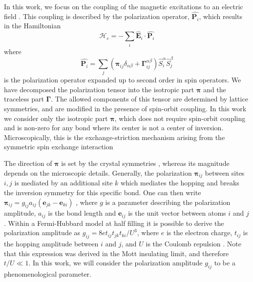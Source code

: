 \documentclass[aps,prb,reprint,twocolumns,superscriptaddress,nofootinbib]{revtex4-2}
\begin{document}
	In this work, we focus on the coupling of the magnetic excitations to an electric field \cite{damascelliDirectTwoMagnonOptical1998,azumaOpticalResponseDue2005,schoenfeldDynamicalRenormalizationMagnetic2024}. This coupling is described by the polarization operator, $\hat{\bm P_{i}}$, which results in the Hamiltonian \cite{moriyaTheoryLightScattering1967,zhuSpinorbitCouplingElectronic2014,malzTopologicalMagnonAmplification2019,seifertOpticalExcitationMagnons2019,mostovoyMultiferroicsDifferentRoutes2024}
	\begin{equation}
		\mathcal H_c = -\sum_i \hat{\bm E}_i \cdot \hat{\bm P_{i}}
	\end{equation}
	where 
	\begin{equation}
		\hat{\bm P_{i}} = \sum_j\left(\bm\pi_{ij}\delta_{\alpha\beta} +\bm\Gamma_{ij}^{\alpha\beta} \right) \hat S_i^\alpha \hat S_j^\beta
	\end{equation}
	is the polarization operator expanded up to second order in spin operators. 
	We have decomposed the polarization tensor into the isotropic part $\bm \pi$ and the traceless part $\bm \Gamma$. The allowed components of this tensor are determined by lattice symmetries, and are modified in the presence of spin-orbit coupling. 
	In this work we consider only the isotropic part $\bm\pi$, which does not require spin-orbit coupling and is non-zero for any bond where its center is not a center of inversion. Microscopically, this is the exchange-striction mechanism arising from the symmetric spin exchange interaction \cite{sergienkoFerroelectricityMagneticEPhase2006,bolensTheoryElectronicMagnetoelectric2018}
	
	The direction of $\bm \pi$ is set by the crystal symmetries \cite{moriyaTheoryLightScattering1967,seifertOpticalExcitationMagnons2019,bolensTheoryElectronicMagnetoelectric2018}, whereas its magnitude depends on the microscopic details. Generally, the polarization $\bm\pi_{ij}$ between sites $i,j$ is mediated by an additional site $k$ which mediates the hopping and breaks the inversion symmetry for this specific bond. One can then write
	$  \bm \pi_{ij} = g_{ij}a_{ij}(\bm e_{jk} - \bm e_{ki})$ \cite{zhuSpinorbitCouplingElectronic2014}, where $g$ is a parameter describing the polarization amplitude, $a_{ij}$ is the bond length and $\bm e_{ij}$ is the unit vector between atoms $i$ and $j$. Within a Fermi-Hubbard model at half filling it is possible to derive the polarization amplitude as 
	$g_{ij}= 8e t_{ij}t_{jk}t_{ki}/U^3$, where $e$ is the electron charge, $t_{ij}$ is the hopping amplitude between $i$ and $j$, and $U$ is the Coulomb repulsion \cite{zhuSpinorbitCouplingElectronic2014}. Note that this expression was derived in the Mott insulating limit, and therefore $t/U\ll1$. In this work, we will consider the polarization amplitude $g_{ij}$ to be a phenomenological parameter.
	
\end{document}
